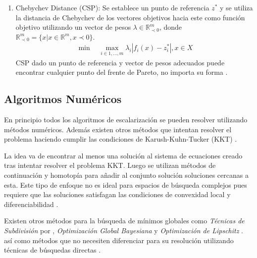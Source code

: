 \begin{enumerate}
\item Chebychev Distance (CSP): Se establece un punto de referencia $z^*$ y se utiliza la distancia de Chebychev de los vectores objetivos hacia este como funci\'on objetivo utilizando un vector de pesos $\lambda \in \mathbb{R}^m_{\prec 0}$, donde $\mathbb{R}^m_{\prec 0} = \{x | x \in \mathbb{R}^m, x \prec 0 \}$. 
    \begin{align*}
        \min \quad \max_{i \in {1,...,m}} \lambda_i |f_i(x) - z^*_i|, x \in X 
    \end{align*}
    CSP dado un punto de referencia y vector de pesos adecuados puede encontrar cualquier punto del frente de Pareto, no importa su forma .
\end{enumerate}



\subsection{Algoritmos Num\'ericos}

En principio todos los algoritmos de escalarizaci\'on se pueden resolver utilizando m\'etodos num\'ericos. Adem\'as existen otros m\'etodos  que intentan resolver el problema haciendo cumplir las condiciones de Karush-Kuhn-Tucker (KKT) .

La idea va de encontrar al menos una soluci\'on al sistema de ecuaciones creado tras intentar resolver el problema KKT. Luego se utilizan m\'etodos de continuaci\'on y homotop\'ia para añadir al conjunto soluci\'on soluciones cercanas a esta. 
Este tipo de enfoque no es ideal para espacios de b\'usqueda complejos pues requiere que las soluciones satisfagan las condiciones de convexidad local y diferenciabilidad .

Existen otros m\'etodos para la b\'usqueda de m\'inimos globales como \textit{T\'ecnicas de Subdivisi\'on} por , \textit{Optimizaci\'on Global Bayesiana}  y \textit{Optimizaci\'on de Lipschitz} . %
as\'i como m\'etodos que no necesiten diferenciar para su resoluci\'on utilizando t\'ecnicas de b\'usquedas directas .


